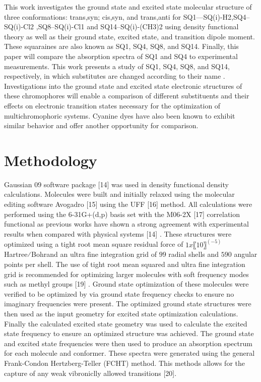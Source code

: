\documentclass[journal=jacsat,manuscript=article]{achemso}
\begin{document}
This work investigates the ground state and excited state molecular structure of three conformations: trans,syn; cis,syn, and trans,anti for SQ1—SQ(i)-H2,SQ4--SQ(i)-Cl2 ,SQ8--SQ(i)-Cl1 and SQ14--SQ(i)-(CH3)2 using density functional theory as well as their ground state, excited state, and transition dipole moment. These squaraines are also known as SQ1, SQ4, SQ8, and SQ14. Finally, this paper will compare the absorption spectra of SQ1 and SQ4 to experimental measurements. This work presents a study of SQ1, SQ4, SQ8, and SQ14, respectively, in which substitutes are changed according to their name . Investigations into the ground state and excited state electronic structures of these chromophores will enable a comparison of different substituents and their effects on electronic transition states necessary for the optimization of multichromophoric systems. Cyanine dyes have also been known to exhibit similar behavior and offer another opportunity for comparison\cite{Fothergill2018AbDyes}.


\section{Methodology}
Gaussian 09 software package [14]⁠ was used in density functional density calculations. Molecules were built and initially relaxed using the molecular editing software Avogadro [15]⁠ using the UFF [16]⁠ method. All calculations were performed using the 6-31G+(d,p) basis set with the M06-2X [17]⁠ correlation functional as previous works have shown a strong agreement with experimental results when compared with physical systems [14] . These structures were optimized using a tight root mean square residual force of $1x〖10〗^(-5)$  Hartree⁄Bohrand an ultra fine integration grid of $99$ radial shells and $590$ angular points per shell. The use of tight root mean squared and ultra fine integration grid is recommended for optimizing larger molecules with soft frequency modes such as methyl groups [19]⁠ . Ground state optimization of these molecules were verified to be optimized by via ground state frequency checks to ensure no imaginary frequencies were present. The optimized ground state structures were then used as the input geometry for excited state optimization calculations. Finally the calculated excited state geometry was used to calculate the excited state frequency to ensure an optimized structure was achieved.  The ground state and excited state frequencies were then used to produce an absorption spectrum for each molecule and conformer. These spectra were generated using the general Frank-Condon Hertzberg-Teller (FCHT) method. This methods allows for the capture of any weak vibroniclly allowed transitions [20]⁠.
\end{document}
